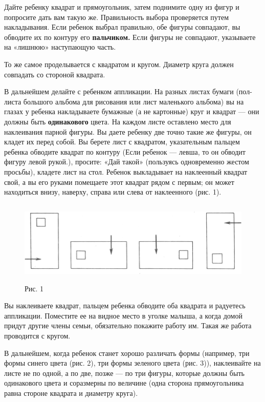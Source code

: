 \documentclass[a5paper]{book}
\begin{document}
Дайте ребенку квадрат и прямоугольник, затем поднимите одну из фигур и
попросите дать вам такую же. Правильность выбора проверяется путем
накладывания. Если ребенок выбрал правильно, обе фигуры совпадают, вы
обводите их по контуру его \textbf{пальчиком.} Если фигуры не совпадают,
указываете на «лишнюю» наступающую часть.

То же самое проделывается с квадратом и кругом. Диаметр круга должен
совпадать со стороной квадрата.

В дальнейшем делайте с ребенком аппликации. На разных листах бумаги
(пол-листа большого альбома для рисования или лист маленького альбома)
вы на глазах у ребенка накладываете бумажные (а не картонные) круг и
квадрат --- они должны быть \textbf{одинакового} цвета. На каждом листе
оставлено место для наклеивания парной фигуры. Вы даете ребенку две
точно такие же фигуры, он кладет их перед собой. Вы берете лист с
квадратом, указательным пальцем ребенка обводите квадрат по контуру
(Если ребенок --- левша, то он обводит фигуру левой рукой.), просите:
«Дай такой» (пользуясь одновременно жестом просьбы), кладете лист на
стол. Ребенок выкладывает на наклеенный квадрат свой, а вы его руками
помещаете этот квадрат рядом с первым; он может находиться внизу,
наверху, справа или слева от наклеенного (рис. 1).

\begin{figure}
\centering
\includegraphics[width=5.39681in,height=1.56704in]{media/media/image1.jpg}
\caption*{Рис. 1}
\end{figure}

Вы наклеиваете квадрат, пальцем ребенка обводите оба квадрата и
радуетесь аппликации. Поместите ее на видное место в уголке малыша, а
когда домой придут другие члены семьи, обязательно покажите работу им.
Такая же работа проводится с кругом.

В дальнейшем, когда ребенок станет хорошо различать формы (например, три
формы синего цвета (рис. 2), три формы зеленого цвета (рис. 3)),
наклеивайте на листе не по одной, а по две, позже --- по три фигуры,
которые должны быть одинакового цвета и соразмерны по величине (одна
сторона прямоугольника равна стороне квадрата и диаметру круга).
\end{document}
